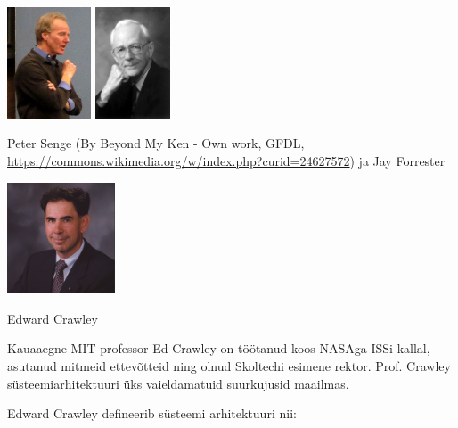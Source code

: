 \begin{marginfigure}
	\begin{center}
		\includegraphics[height=3.3cm]{Peter_Senge_at_Quest_to_Learn.jpg}
		\includegraphics[height=3.3cm]{jayforrester.jpg}
		\caption{Peter Senge (By Beyond My Ken - Own work, GFDL, \url{https://commons.wikimedia.org/w/index.php?curid=24627572}) ja Jay Forrester}
		\label{fig:legendid}
	\end{center}
\end{marginfigure}


\begin{marginfigure}
	\begin{center}
		\includegraphics[height=3.3cm]{MIT-Ed-Crawley_0.jpg}
		\caption{Edward Crawley}
		\label{fig:ed}
	\end{center}
	Kauaaegne MIT professor Ed Crawley on töötanud koos NASAga ISSi kallal, asutanud mitmeid ettevõtteid ning olnud Skoltechi esimene rektor. Prof. Crawley süsteemiarhitektuuri üks vaieldamatuid suurkujusid maailmas.
\end{marginfigure}

Edward Crawley defineerib süsteemi arhitektuuri nii:

